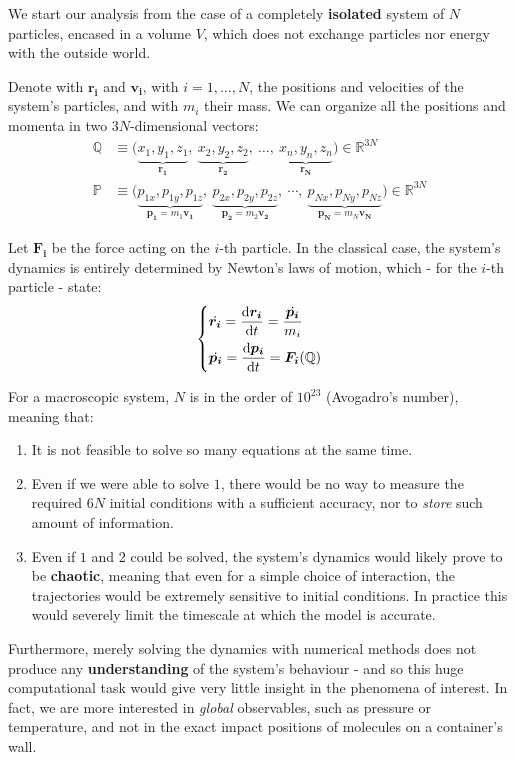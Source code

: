 \documentclass[../template.tex]{subfiles}
\begin{document}
\medskip

We start our analysis from the case of a completely \textbf{isolated} system of $N$ particles, encased in a volume $V$, which does not exchange particles nor energy with the outside world.

Denote with $\bm{r_i}$ and $\bm{v_i}$, with $i=1, \dots, N$, the positions and velocities of the system's particles, and with $m_i$ their mass. We can organize all the positions and momenta in two $3N$-dimensional vectors:
\begin{align*}
    \mathbb{Q} &\equiv \Big( \underbrace{x_1, y_1, z_1}_{\bm{r_1}},\> \underbrace{x_2, y_2, z_2}_{\bm{r_2}},\> \dots,\> \underbrace{x_n, y_n, z_n}_{\bm{r_N}}   \Big) \in \mathbb{R}^{3N}\\
    \mathbb{P} &\equiv \Big(\underbrace{p_{1x}, p_{1y}, p_{1z}}_{\bm{p_1}=m_1 \bm{v_1}},\> \underbrace{p_{2x}, p_{2y}, p_{2z}}_{\bm{p_2} = m_2 \bm{v_2}}, \>\cdots,\> \underbrace{p_{Nx}, p_{Ny}, p_{Nz}}_{\bm{p_N} = m_N \bm{v_N}} \Big) \in \mathbb{R}^{3N}
\end{align*}


Let $\bm{F_i}$ be the force acting on the $i$-th particle. In the classical case, the system's dynamics is entirely determined by Newton's laws of motion, which - for the $i$-th particle - state:
\begin{align}\label{eqn:equations}
    \begin{dcases}
        \dot{\bm{r_i}} = \dv{\bm{r_i}}{t} = \frac{\dot{\bm{p_i}}}{m_i}\\ 
        \dot{\bm{p_i}} = \dv{\bm{p_i}}{t} = \bm{F_i}(\mathbb{Q})
    \end{dcases}
\end{align}

For a macroscopic system, $N$ is in the order of $10^{23}$ (Avogadro's number), meaning that:
\begin{enumerate}
    \item It is not feasible to solve so many equations at the same time. 
    \item Even if we were able to solve $1$, there would be no way to measure the required $6N$ initial conditions with a sufficient accuracy, nor to \textit{store} such amount of information.
    \item Even if $1$ and $2$ could be solved, the system's dynamics would likely
prove to be \textbf{chaotic}, meaning that even for a simple choice of interaction, the trajectories would be extremely sensitive to initial conditions. In practice this would severely limit the timescale at which the model is accurate.
\end{enumerate}
Furthermore, merely solving the dynamics with numerical methods does not produce any \textbf{understanding} of the system's behaviour - and so this huge computational task would give very little insight in the phenomena of interest.
In fact, we are more interested in \textit{global} observables, such as pressure or temperature, and not in the exact impact positions of molecules on a container's wall.
\end{document}
